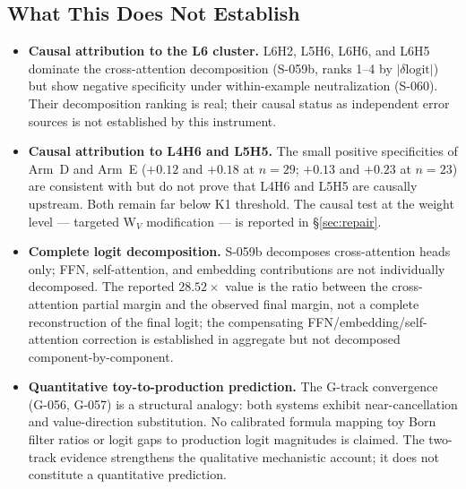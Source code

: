 \subsection{What This Does Not Establish}

\begin{itemize}
  \item \textbf{Causal attribution to the L6 cluster.}
    L6H2, L5H6, L6H6, and L6H5 dominate the cross-attention decomposition (S-059b,
    ranks 1--4 by $|\delta\text{logit}|$) but show negative specificity under
    within-example neutralization (S-060).
    Their decomposition ranking is real; their causal status as independent
    error sources is not established by this instrument.

  \item \textbf{Causal attribution to L4H6 and L5H5.}
    The small positive specificities of Arm~D and Arm~E ($+0.12$ and $+0.18$ at
    $n=29$; $+0.13$ and $+0.23$ at $n=23$) are consistent with but do not prove
    that L4H6 and L5H5 are causally upstream.
    Both remain far below K1 threshold.
    The causal test at the weight level --- targeted W$_V$ modification ---
    is reported in \S\ref{sec:repair}.

  \item \textbf{Complete logit decomposition.}
    S-059b decomposes cross-attention heads only; FFN, self-attention, and embedding
    contributions are not individually decomposed.
    The reported $28.52\times$ value is the ratio between the cross-attention partial
    margin and the observed final margin, not a complete reconstruction of the final
    logit; the compensating FFN/embedding/self-attention correction is established in
    aggregate but not decomposed component-by-component.

  \item \textbf{Quantitative toy-to-production prediction.}
    The G-track convergence (G-056, G-057) is a structural analogy: both systems
    exhibit near-cancellation and value-direction substitution.
    No calibrated formula mapping toy Born filter ratios or logit gaps to production
    logit magnitudes is claimed.
    The two-track evidence strengthens the qualitative mechanistic account; it does
    not constitute a quantitative prediction.
\end{itemize}
